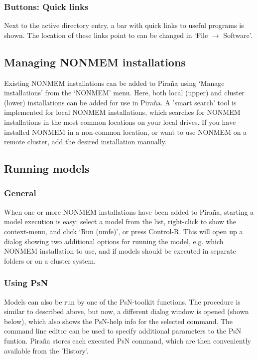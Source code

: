 \documentclass[a4,11pt]{report} \usepackage[pdftex]{graphicx}
\begin{document}
{\subsubsection*{Buttons: Quick links} Next to the active directory entry, a bar
with quick links to useful programs is shown. The location of these links
point to can be changed in `File $\rightarrow$ Software'.

\subsection*{Managing NONMEM installations} Existing NONMEM
installations can be added to Pira\~na using `Manage installations'
from the `NONMEM' menu. Here, both local (upper) and cluster (lower)
installations can be added for use in Pira\~na. A 'smart search' tool
is implemented for local NONMEM installations, which searches for
NONMEM installations in the most common locations on your local
drives. If you have installed NONMEM in a non-common location, or want
to use NONMEM on a remote cluster, add the desired installation
manually.

\subsection{Running models}
\subsubsection*{General}
When one or more NONMEM installations have been added to Pira\~na,
starting a model execution is easy: select a model from the list,
right-click to show the context-menu, and click `Run (nmfe)', or press
Control-R. This will open up a dialog showing two additional options
for running the model, e.g. which NONMEM installation to use, and if
models should be executed in separate folders or on a cluster system.

\subsubsection{Using PsN}
Models can also be run by one of the PsN-toolkit functions. The
procedure is similar to described above, but now, a different dialog
window is opened (shown below), which also shows the PsN-help info for
the selected command. The command line editor can be used to specify
additional parameters to the PsN funtion. Pira\~na stores each
executed PsN command, which are then conveniently available from the
'History'.

}
\end{document}
